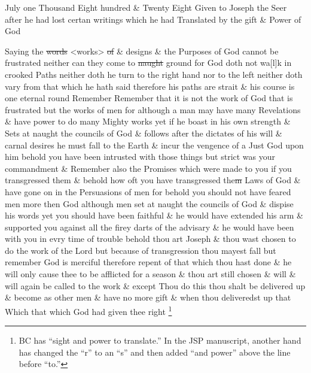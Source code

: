 				July one Thousand Eight hundred \& Twenty Eight Given to Joseph the Seer after he had lost certan writings which he had Translated by the gift \& Power of God
				
				Saying the \sout{words} <works> \sout{of} \& designs \& the Purposes of God cannot be frustrated neither can they come to \sout{naught} ground for God doth not wa[l]k in crooked Paths neither doth he turn to the right hand nor to the left neither doth vary from that which he hath said therefore his paths are strait \& his course is one eternal round Remember Remember that it is not the work of God that is frustrated but the works of men for although a man may have many Revelations \& have power to do many Mighty works yet if he boast in his own strength \& Sets at naught the councils of God \& follows after the dictates of his will \& carnal desires he must fall to the Earth \& incur the vengence of a Just God upon him behold you have been intrusted with those things but strict was your commandment \& Remember also the Promises which were made to you if you transgressed them \& behold how oft you have transgressed the\sout{m} Laws of God \& have gone on in the Persuasions of men for behold you should not have feared men more then God although men set at naught the councils of God \& dispise his words yet you should have been faithful \& he would have extended his arm \& supported you against all the firey darts of the advisary \& he would have been with you in evry time of trouble behold thou art Joseph \& thou wast chosen to do the work of the Lord but because of transgression thou mayest fall but remember God is merciful therefore repent of that which thou hast done \& he will only cause thee to be afflicted for a season \& thou art still chosen \& will \& will again be called to the work \& except Thou do this thou shalt be delivered up \& become as other men \& have no more gift \& when thou deliveredst up that Which that which God had given thee right%
					\footnote{%
						BC has ``sight and power to translate.'' In the JSP manuscript, another hand has changed the ``r'' to an ``s'' and then added ``and power'' above the line before ``to.'' 
						}
